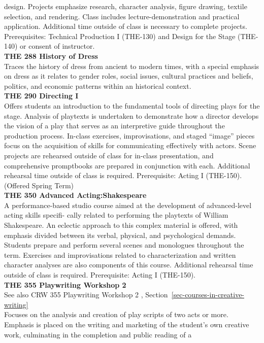\documentclass[
  letterpaper,
]{scrbook}
\begin{document}
design. Projects emphasize research, character analysis, figure drawing,
textile selection, and rendering. Class includes lecture-demonstration
and practical application. Additional time outside of class is necessary
to complete projects. Prerequisites: Technical Production I (THE-130)
and Design for the Stage (THE-140) or consent of instructor.\\
\textbf{THE 288 History of Dress}\\
Traces the history of dress from ancient to modern times, with a special
emphasis on dress as it relates to gender roles, social issues, cultural
practices and beliefs, politics, and economic patterns within an
historical context.\\
\textbf{THE 290 Directing I}\\
Offers students an introduction to the fundamental tools of directing
plays for the stage. Analysis of playtexts is undertaken to demonstrate
how a director develops the vision of a play that serves as an
interpretive guide throughout the production process. In-class
exercises, improvisations, and staged ``image'' pieces focus on the
acquisition of skills for communicating effectively with actors. Scene
projects are rehearsed outside of class for in-class presentation, and
comprehensive promptbooks are prepared in conjunction with each.
Additional rehearsal time outside of class is required. Prerequisite:
Acting I (THE-150). (Offered Spring Term)\\
\textbf{THE 350 Advanced Acting:Shakespeare}\\
A performance-based studio course aimed at the development of
advanced-level acting skills specifi- cally related to performing the
playtexts of William Shakespeare. An eclectic approach to this complex
material is offered, with emphasis divided between its verbal, physical,
and psychological demands. Students prepare and perform several scenes
and monologues throughout the term. Exercises and improvisations related
to characterization and written character analyses are also components
of this course. Additional rehearsal time outside of class is required.
Prerequisite: Acting I (THE-150).\\
\textbf{THE 355 Playwriting Workshop 2}\\
See also CRW 355 Playwriting Workshop 2 ,
Section~\ref{sec-courses-in-creative-writing}\\
Focuses on the analysis and creation of play scripts of two acts or
more. Emphasis is placed on the writing and marketing of the student's
own creative work, culminating in the completion and public reading of a
\end{document}
